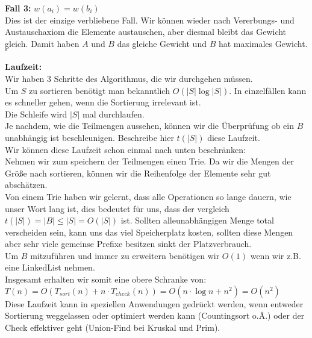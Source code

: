 \documentclass[11pt,a4paper,ngerman]{article}
\begin{document}
\begin{enumerate}[\bfseries (a)]
\textbf{Fall 3:} $w(a_i) = w(b_i)$\\
Dies ist der einzige verbliebene Fall. Wir können wieder nach Vererbungs- und Austauschaxiom die Elemente austauschen, aber diesmal bleibt das Gewicht gleich. Damit haben $A$ und $B$ das gleiche Gewicht und $B$ hat maximales Gewicht.\\
\mbox{} \hfill $\square$

\textbf{Laufzeit:}\\

Wir haben 3 Schritte des Algorithmus, die wir durchgehen müssen.\\

Um $S$ zu sortieren benötigt man bekanntlich $O ( |S| \log |S|) $. In einzelfällen kann es schneller gehen, wenn die Sortierung irrelevant ist.\\

Die Schleife wird $|S|$ mal durchlaufen.\\
Je nachdem, wie die Teilmengen aussehen, können wir die Überprüfung ob ein $B$ unabhängig ist beschleunigen. Beschreibe hier $t(|S|)$ diese Laufzeit.\\
Wir können diese Laufzeit schon einmal nach unten beschränken:\\

Nehmen wir zum speichern der Teilmengen einen Trie. Da wir die Mengen der Größe nach sortieren, können wir die Reihenfolge der Elemente sehr gut abschätzen.\\
Von einem Trie haben wir gelernt, dass alle Operationen so lange dauern, wie unser Wort lang ist, dies bedeutet für uns, dass der vergleich $t(|S|) = |B| \leq |S| = O (|S| )$ ist. Sollten alleunabhängigen Menge total verscheiden sein, kann uns das viel Speicherplatz kosten, sollten diese Mengen aber sehr viele gemeinse Prefixe besitzen sinkt der Platzverbrauch.\\

Um $B$ mitzuführen und immer zu erweitern benötigen wir $O(1)$ wenn wir z.B. eine LinkedList nehmen.\\

Insgesamt erhalten wir somit eine obere Schranke von:\\
$T(n) = O( T_{sort}(n) + n \cdot T_{check} (n) ) = O(n \cdot \log n + n^2) = O(n^2)$\\

Diese Laufzeit kann in speziellen Anwendungen gedrückt werden, wenn entweder Sortierung weggelassen oder optimiert werden kann (Countingsort o.Ä.) oder der Check effektiver geht (Union-Find bei Kruskal und Prim). 
\end{enumerate}

\label{LastPage}
\end{document}
